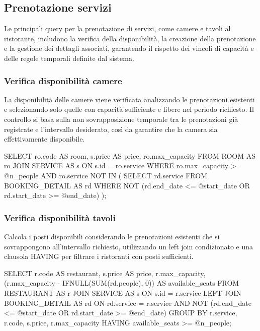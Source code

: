\documentclass[a4paper,12pt]{report}
\begin{document}
\newpage
\subsection{Prenotazione servizi}
Le principali query per la prenotazione di servizi, come camere e
tavoli al ristorante, includono la verifica della disponibilità, la
creazione della prenotazione e la gestione dei dettagli associati,
garantendo il rispetto dei vincoli di capacità e delle regole
temporali definite dal sistema.

\subsubsection{Verifica disponibilità camere}
La disponibilità delle camere viene verificata analizzando le
prenotazioni esistenti e selezionando solo quelle con capacità
sufficiente e libere nel periodo richiesto. Il controllo si basa
sulla non sovrapposizione temporale tra le prenotazioni già
registrate e l'intervallo desiderato, così da garantire che la camera
sia effettivamente disponibile.

\begin{sqlcode}[caption={}]
SELECT
  ro.code AS room,
  s.price AS price,
  ro.max_capacity
FROM ROOM AS ro
JOIN SERVICE AS s
  ON s.id = ro.service
WHERE
  ro.max_capacity >= @n_people
  AND ro.service NOT IN (
    SELECT rd.service
  FROM BOOKING_DETAIL AS rd
    WHERE NOT (rd.end_date <= @start_date OR rd.start_date >= @end_date)
  );
\end{sqlcode}

\subsubsection{Verifica disponibilità tavoli}
Calcola i posti disponibili considerando le prenotazioni esistenti
che si sovrappongono all'intervallo richiesto, utilizzando un left
join condizionato e una clausola HAVING per filtrare i ristoranti con
posti sufficienti.

\begin{sqlcode}[caption={}]
SELECT
  r.code AS restaurant,
  s.price AS price,
  r.max_capacity,
  (r.max_capacity - IFNULL(SUM(rd.people), 0)) AS available_seats
FROM RESTAURANT AS r
JOIN SERVICE AS s ON s.id = r.service
LEFT JOIN BOOKING_DETAIL AS rd ON rd.service = r.service
  AND NOT (rd.end_date <= @start_date OR rd.start_date >= @end_date)
GROUP BY r.service, r.code, s.price, r.max_capacity
HAVING available_seats >= @n_people;
\end{sqlcode}
\end{document}
